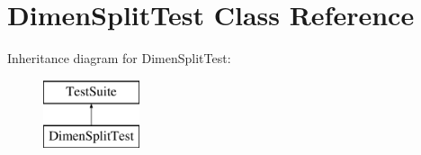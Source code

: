 \hypertarget{classDimenSplitTest}{\section{Dimen\-Split\-Test Class Reference}
\label{classDimenSplitTest}
}
Inheritance diagram for Dimen\-Split\-Test\-:\begin{figure}[H]
\begin{center}
\leavevmode
\includegraphics[height=2.000000cm]{classDimenSplitTest}
\end{center}
\end{figure}
